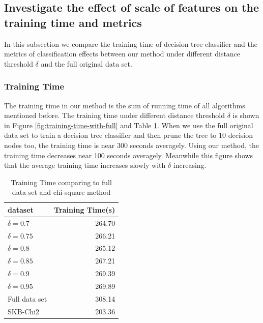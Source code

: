 \documentclass{ieeeaccess}
\theoremstyle{definition}
\begin{document}
\subsection{Investigate the effect of scale of features on the training time and metrics}

In this subsection we compare the training time of decision tree classifier and the metrics of classification effects between our method under different distance threshold $\delta$ and the full original data set.

\subsubsection{Training Time}

The training time in our method is the sum of running time of all algorithms mentioned before. The training time under different distance threshold $\delta$ is shown in Figure \ref{fig:training-time-with-full} and Table \ref{tab:training-time-all}.
When we use the full original data set to train a decision tree classifier and then prune the tree to 10 decision nodes too, the training time is near 300 seconds averagely. Using our method, the training time decreases near 100 seconds averagely.
Meanwhile this figure shows that the average training time increases slowly with $\delta$ increasing.

\begin{table}[!htbp]
    \centering
    \caption{Training Time comparing to full data set and chi-square method}
    \label{tab:training-time-all}
    \begin{tabular}{lr}
        \toprule
        dataset & Training Time(s) \\
        \midrule
        $\delta=0.7$ & 264.70 \\
        $\delta=0.75$ & 266.21 \\
        $\delta=0.8$ & 265.12 \\
        $\delta=0.85$ &  267.21 \\
        $\delta=0.9$ &   269.39 \\
        $\delta=0.95$ & 269.89 \\
        Full data set & 308.14 \\
        SKB-Chi2 & 203.36 \\
        \bottomrule
    \end{tabular}
\end{table}
\end{document}
